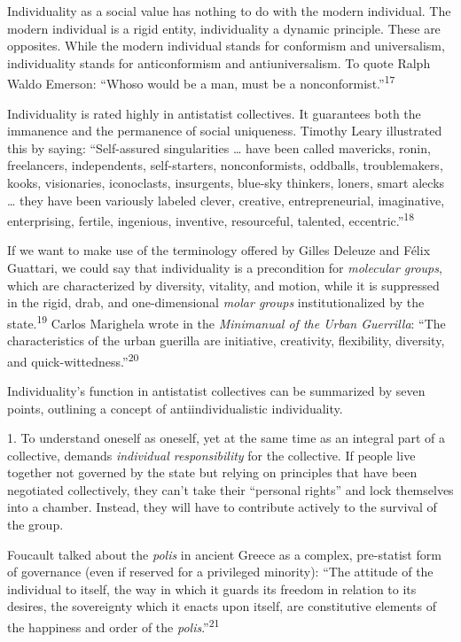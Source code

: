 Individuality as a social value has nothing to do with the modern individual.
The modern individual is a rigid entity, individuality a dynamic principle.
These are opposites. While the modern individual stands for conformism and
universalism, individuality stands for anticonformism and antiuniversalism. To
quote Ralph Waldo Emerson: “Whoso would be a man, must be a
nonconformist.”\textsuperscript{17}

Individuality is rated highly in antistatist collectives. It guarantees both the
immanence and the permanence of social uniqueness. Timothy Leary illustrated
this by saying: “Self-assured singularities … have been called mavericks, ronin,
freelancers, independents, self-starters, nonconformists, oddballs,
troublemakers, kooks, visionaries, iconoclasts, insurgents, blue-sky thinkers,
loners, smart alecks … they have been variously labeled clever, creative,
entrepreneurial, imaginative, enterprising, fertile, ingenious, inventive,
resourceful, talented, eccentric.”\textsuperscript{18}

If we want to make use of the terminology offered by Gilles Deleuze and Félix
Guattari, we could say that individuality is a precondition for
\textit{molecular groups}, which are characterized by diversity, vitality, and
motion, while it is suppressed in the rigid, drab, and one-dimensional
\textit{molar groups} institutionalized by the state.\textsuperscript{19}
Carlos Marighela wrote in the \textit{Minimanual of the Urban Guerrilla}: “The
characteristics of the urban guerilla are initiative, creativity, flexibility,
diversity, and quick-wittedness.”\textsuperscript{20}

Individuality’s function in antistatist collectives can be summarized by seven
points, outlining a concept of antiindividualistic individuality.

1. To understand oneself as oneself, yet at the same time as an integral part of
a collective, demands \textit{individual responsibility} for the collective. If
people live together not governed by the state but relying on principles that
have been negotiated collectively, they can’t take their “personal rights” and
lock themselves into a chamber. Instead, they will have to contribute actively
to the survival of the group.

Foucault talked about the \textit{polis} in ancient Greece as a complex,
pre-statist form of governance (even if reserved for a privileged minority):
“The attitude of the individual to itself, the way in which it guards its
freedom in relation to its desires, the sovereignty which it enacts upon itself,
are constitutive elements of the happiness and order of the
\textit{polis}.”\textsuperscript{21}

